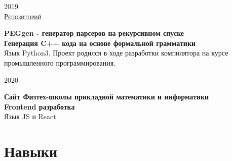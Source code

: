 \documentclass{article}
\newcommand{\entry}[3]{
    \begin{minipage}[t]{.11\linewidth}
        \hfill \textsc{#1}
    \end{minipage}
    \hfill\vline\hfill
    \begin{minipage}[t]{.80\linewidth}
        \textbf{#2}\\
        \footnotesize{#3}
    \end{minipage}
}
\begin{document}
    \vspace{.2cm}
    
    \entry {2019 \\
    \href {https://github.com/InversionSpaces/PEGgen} {Репозиторий} }
    {PEGgen - генератор парсеров на рекурсивном спуске \\
    Генерация C++ кода на основе формальной грамматики}
    {Язык Python3. Проект родился в ходе разработки компилятора на курсе промышленного программирования.} 
    
    \vspace{.2cm}
    
    \entry {2020}
    {Сайт Физтех-школы прикладной математики и информатики\\
    Frontend разработка}
    {Язык JS и React}

    \section{Навыки}
\end{document}
